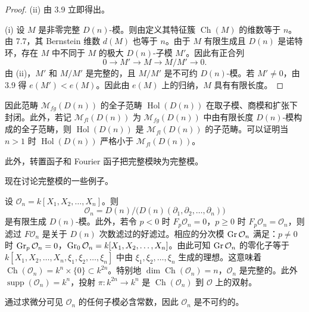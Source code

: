 \begin{proof}
(ii) 由 3.9 立即得出。

(i) 设 $M$ 是非零完整 $D(n)$-模。则由定义其特征簇 $\operatorname{Ch}(M)$ 的维数等于 $n$。由 7.7，其 Bernstein 维数 $d(M)$ 也等于 $n$。由于 $M$ 有限生成且 $D(n)$ 是诺特环，存在 $M$ 中不同于 $M$ 的极大 $D(n)$-子模 $M'$。因此有正合列
$$0\longrightarrow M'\longrightarrow M\longrightarrow M/M'\longrightarrow 0.$$
由 (ii)，$M'$ 和 $M/M'$ 是完整的，且 $M/M'$ 是不可约 $D(n)$-模。若 $M'\neq 0$，由 3.9 得 $e(M')<e(M)$。因此由 $e(M)$ 上的归纳，$M$ 具有有限长度。
\end{proof}

因此范畴 $\mathcal{M}_{fg}(D(n))$ 的全子范畴 $\operatorname{Hol}(D(n))$ 在取子模、商模和扩张下封闭。此外，若记 $\mathcal{M}_{fl}(D(n))$ 为 $\mathcal{M}_{fg}(D(n))$ 中由有限长度 $D(n)$-模构成的全子范畴，则 $\operatorname{Hol}(D(n))$ 是 $\mathcal{M}_{fl}(D(n))$ 的子范畴。可以证明当 $n>1$ 时 $\operatorname{Hol}(D(n))$ 严格小于 $\mathcal{M}_{fl}(D(n))$。

此外，转置函子和 Fourier 函子把完整模映为完整模。

现在讨论完整模的一些例子。

\begin{example}
设 $\mathcal{O}_n=k[X_1,X_2,\dots,X_n]$。则
$$\mathcal{O}_n=D(n)/\bigl(D(n)(\partial_1,\partial_2,\dots,\partial_n)\bigr)$$
是有限生成 $D(n)$-模。此外，若令 $p<0$ 时 $F_p\mathcal{O}_n=0$，$p\ge 0$ 时 $F_p\mathcal{O}_n=\mathcal{O}_n$，则滤过 $F\mathcal{O}_n$ 是关于 $D(n)$ 次数滤过的好滤过。相应的分次模 $\operatorname{Gr}\mathcal{O}_n$ 满足：$p\neq 0$ 时 $\operatorname{Gr}_p\mathcal{O}_n=0$，$\operatorname{Gr}_0\mathcal{O}_n=k[X_1,X_2,\dots,X_n]$。由此可知 $\operatorname{Gr}\mathcal{O}_n$ 的零化子等于 $k[X_1,X_2,\dots,X_n,\xi_1,\xi_2,\dots,\xi_n]$ 中由 $\xi_1,\xi_2,\dots,\xi_n$ 生成的理想。这意味着 $\operatorname{Ch}(\mathcal{O}_n)=k^n\times\{0\}\subset k^{2n}$。特别地 $\dim\operatorname{Ch}(\mathcal{O}_n)=n$，$\mathcal{O}_n$ 是完整的。此外 $\operatorname{supp}(\mathcal{O}_n)=k^n$，投射 $\pi:k^{2n}\longrightarrow k^n$ 是 $\operatorname{Ch}(\mathcal{O}_n)$ 到 $\mathcal{O}$ 上的双射。

通过求微分可见 $\mathcal{O}_n$ 的任何子模必含常数，因此 $\mathcal{O}_n$ 是不可约的。
\end{example}

